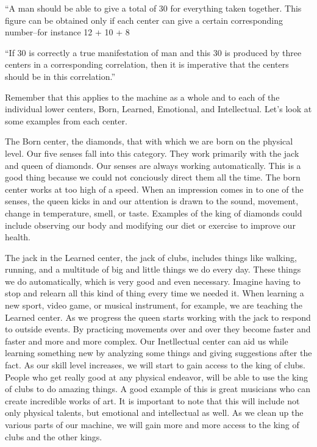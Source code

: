 \documentclass[12pt,letterpaper]{book}
\begin{document}
``A man should be able to give a total of 30 for everything taken together. This figure can be obtained only if each center can give a certain corresponding number--for instance 12 + 10 + 8

``If 30 is correctly a true manifestation of man and this 30 is produced by three centers in a corresponding correlation, then it is imperative that the centers should be in this correlation.''

Remember that this applies to the machine as a whole and to each of the individual lower centers, Born, Learned, Emotional, and Intellectual. Let's look at some examples from each center.

The Born center, the diamonds, that with which we are born on the physical level. Our five senses fall into this category. They work primarily with the jack and queen of diamonds. Our senses are always working automatically. This is a good thing because we could not conciously direct them all the time. The born center works at too high of a speed. When an impression comes in to one of the senses, the queen kicks in and our attention is drawn to the sound, movement, change in temperature, smell, or taste. Examples of the king of diamonds could include observing our body and modifying our diet or exercise to improve our health.

The jack in the Learned center, the jack of clubs, includes things like walking, running, and a multitude of big and little things we do every day. These things we do automatically, which is very good and even necessary. Imagine having to stop and relearn all this kind of thing every time we needed it. When learning a new sport, video game, or musical instrument, for example, we are teaching the Learned center. As we progress the queen starts working with the jack to respond to outside events. By practicing movements over and over they become faster and faster and more and more complex. Our Inetllectual center can aid us while learning something new by analyzing some things and giving suggestions after the fact. As our skill level increases, we will start to gain access to the king of clubs. People who get really good at any physical endeavor, will be able to use the king of clubs to do amazing things. A good example of this is great musicians who can create incredible works of art. It is important to note that this will include not only physical talents, but emotional and intellectual as well. As we clean up the various parts of our machine, we will gain more and more access to the king of clubs and the other kings.
\end{document}
